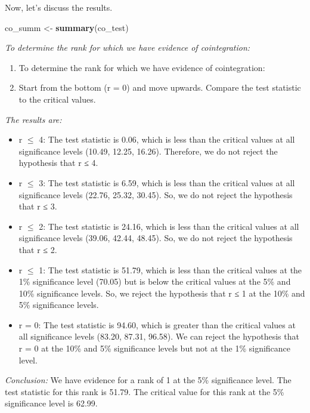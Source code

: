 \documentclass[
]{article}
\newenvironment{Shaded}{\begin{snugshade}}{\end{snugshade}}
\newcommand{\FunctionTok}[1]{\textcolor[rgb]{0.13,0.29,0.53}{\textbf{#1}}}
\newcommand{\NormalTok}[1]{#1}
\newcommand{\OtherTok}[1]{\textcolor[rgb]{0.56,0.35,0.01}{#1}}
\begin{document}
Now, let's discuss the results.

\begin{Shaded}
\begin{Highlighting}[]
\NormalTok{co\_summ }\OtherTok{\textless{}{-}} \FunctionTok{summary}\NormalTok{(co\_test)}
\end{Highlighting}
\end{Shaded}

\emph{To determine the rank for which we have evidence of
cointegration:}

\begin{enumerate}
\def\labelenumi{\arabic{enumi}.}
\item
  To determine the rank for which we have evidence of cointegration:
\item
  Start from the bottom (r = 0) and move upwards. Compare the test
  statistic to the critical values.
\end{enumerate}

\emph{The results are:}

\begin{itemize}
\item
  r \(≤\) 4: The test statistic is 0.06, which is less than the critical
  values at all significance levels (10.49, 12.25, 16.26). Therefore, we
  do not reject the hypothesis that r ≤ 4.
\item
  r \(≤\) 3: The test statistic is 6.59, which is less than the critical
  values at all significance levels (22.76, 25.32, 30.45). So, we do not
  reject the hypothesis that r ≤ 3.
\item
  r \(≤\) 2: The test statistic is 24.16, which is less than the
  critical values at all significance levels (39.06, 42.44, 48.45). So,
  we do not reject the hypothesis that r ≤ 2.
\item
  r \(≤\) 1: The test statistic is 51.79, which is less than the
  critical values at the 1\% significance level (70.05) but is below the
  critical values at the 5\% and 10\% significance levels. So, we reject
  the hypothesis that r ≤ 1 at the 10\% and 5\% significance levels.
\item
  r = 0: The test statistic is 94.60, which is greater than the critical
  values at all significance levels (83.20, 87.31, 96.58). We can reject
  the hypothesis that r = 0 at the 10\% and 5\% significance levels but
  not at the 1\% significance level.
\end{itemize}

\emph{Conclusion:} We have evidence for a rank of 1 at the 5\%
significance level. The test statistic for this rank is 51.79. The
critical value for this rank at the 5\% significance level is 62.99.
\end{document}
